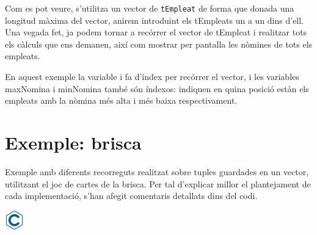 \documentclass[]{book}
\begin{document}
Com es pot veure, s'utilitza un vector de \texttt{tEmpleat} de forma que
donada una longitud màxima del vector, anirem introduint els tEmpleats
un a un dins d'ell. Una vegada fet, ja podem tornar a recórrer el vector
de tEmpleat i realitzar tots els càlculs que ens demanen, així com
mostrar per pantalla les nòmines de tots els empleats.

En aquest exemple la variable i fa d'índex per recórrer el vector, i les
variables maxNomina i minNomina també són índexos: indiquen en quina
posició estàn els empleats amb la nòmina més alta i més baixa
respectivament.

\section{Exemple: brisca}\label{exemple-brisca}

Exemple amb diferents recorreguts realitzat sobre tuples guardades en un
vector, utilitzant el joc de cartes de la brisca. Per tal d'explicar
millor el plantejament de cada implementació, s'han afegit comentaris
detallats dins del codi.

\includegraphics{./img/c.png}
\end{document}

